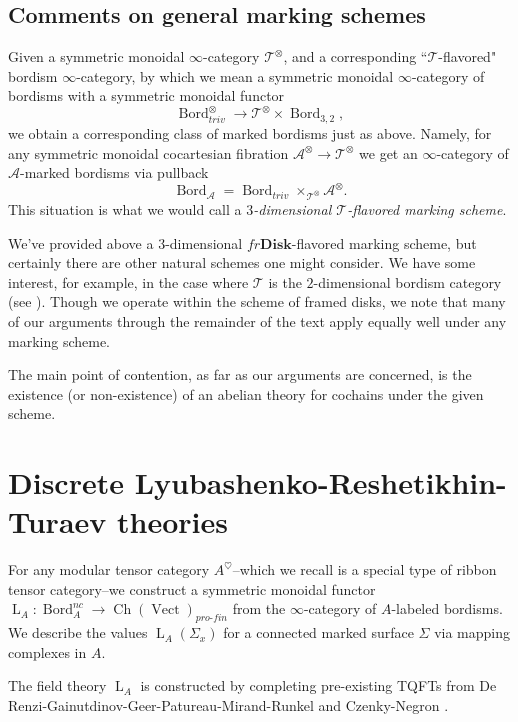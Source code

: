 \documentclass[reqno]{amsart}
\theoremstyle{definition}
\newcommand{\msc}[1]{\mathscr{#1}}
\newcommand{\opn}[1]{\operatorname{#1}}
\newcommand{\ot}{\otimes}
\newcommand{\Disk}{\mathbf{Disk}}
\newcommand{\pf}{pro\text{-}fin}
\DeclareMathOperator{\Bord}{Bord}
\renewcommand{\1}{\mathbf{1}}
\begin{document}
\subsection{Comments on general marking schemes}
\label{sect:mark_scheme}

Given a symmetric monoidal $\infty$-category $\msc{T}^{\ot}$, and a corresponding ``$\msc{T}$-flavored" bordism $\infty$-category, by which we mean a symmetric monoidal $\infty$-category of bordisms with a symmetric monoidal functor
\[
\Bord_{triv}^{\ot}\to \msc{T}^{\ot}\times \Bord_{3,2},
\]
we obtain a corresponding class of marked bordisms just as above. Namely, for any symmetric monoidal cocartesian fibration $\msc{A}^{\ot}\to \msc{T}^{\ot}$ we get an $\infty$-category of $\msc{A}$-marked bordisms via pullback
\[
\Bord_{\msc{A}}=\Bord_{triv}\times_{\msc{T}^{\ot}}\msc{A}^{\ot}.
\]
This situation is what we would call a \emph{$3$-dimensional $\msc{T}$-flavored marking scheme}.
\par

We've provided above a $3$-dimensional $fr\Disk$-flavored marking scheme, but certainly there are other natural schemes one might consider. We have some interest, for example, in the case where $\msc{T}$ is the $2$-dimensional bordism category (see \cite{costello,brochierwoike}). Though we operate within the scheme of framed disks, we note that many of our arguments through the remainder of the text apply equally well under any marking scheme.
\par

The main point of contention, as far as our arguments are concerned, is the existence (or non-existence) of an abelian theory for cochains under the given scheme.


\section{Discrete Lyubashenko-Reshetikhin-Turaev theories}
\label{sect:dis_lrt}

For any modular tensor category $A^{\heartsuit}$--which we recall is a special type of ribbon tensor category--we construct a symmetric monoidal functor $\opn{L}_A:\Bord^{nc}_A\to \opn{Ch}(\opn{Vect})_{\pf}$ from the $\infty$-category of $A$-labeled bordisms.  We describe the values $\opn{L}_A(\Sigma_x)$ for a connected marked surface $\Sigma$ via mapping complexes in $A$.
\par

The field theory $\opn{L}_A$ is constructed by completing pre-existing TQFTs from De Renzi-Gainutdinov-Geer-Patureau-Mirand-Runkel \cite{derenzietal23} and Czenky-Negron \cite{czenkynegron}.
\end{document}
